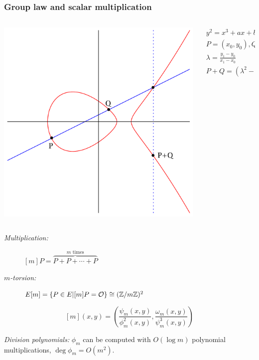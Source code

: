 \documentclass[10pt,usepdftitle=false]{beamer}
\begin{document}
\begin{frame}
\end{frame}


\begin{frame}
  \frametitle{Group law and scalar multiplication}
  
  \begin{columns}
    \begin{column}{0.3\textwidth}
      \includegraphics[width=\textwidth]{../isogeny/ec-add.pdf}
    \end{column}
    \begin{column}{0.55\textwidth}
      \begin{gather*}
        y^2 = x^3 + ax + b\\
        P = (x_0, y_0), Q = (x_1, y_1)\\
        \lambda = \frac{y_1 - y_0}{x_1 - x_0}\\
        P+Q = (\lambda^2 - x_0 - x_1, (x_0 - x_2)\lambda - y_0)
      \end{gather*}
    \end{column}
  \end{columns}

  {\large
    \begin{description}
    \item[\emph{Multiplication:}] $[m]P = \overbrace{P + P + \cdots + P}^{\text{$m$ times}}$
    \item[\emph{$m$-torsion:}] $E[m] = \{P\in E | [m]P=\mathcal{O}\} \cong (\mathbb{Z}/m\mathbb{Z})^2$
    \end{description}}
  
  \[[m](x,y) = \left(\frac{\psi_m(x,y)}{\phi_m^2(x,y)}, \frac{\omega_m(x,y)}{\psi_m^3(x,y)}\right)\]
  
  \emph{Division polynomials:} $\phi_m$ can be computed with $O(\log
  m)$ polynomial multiplications, $\deg\phi_m=O(m^2)$.
\end{frame}
\end{document}
